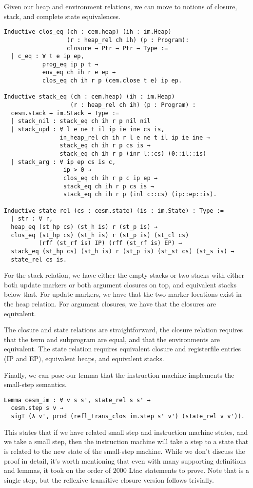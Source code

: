 Given our heap and environment relations, we can move to notions of closure,
stack, and complete state equivalences.

\begin{verbatim}
Inductive clos_eq (ch : cem.heap) (ih : im.Heap) 
                  (r : heap_rel ch ih) (p : Program):
                  closure → Ptr → Ptr → Type :=
  | c_eq : ∀ t e ip ep, 
           prog_eq ip p t → 
           env_eq ch ih r e ep →
           clos_eq ch ih r p (cem.close t e) ip ep. 

Inductive stack_eq (ch : cem.heap) (ih : im.Heap) 
                   (r : heap_rel ch ih) (p : Program) : 
  cesm.stack → im.Stack → Type := 
  | stack_nil : stack_eq ch ih r p nil nil
  | stack_upd : ∀ l e ne t il ip ie ine cs is, 
                in_heap_rel ch ih r l e ne t il ip ie ine →
                stack_eq ch ih r p cs is →
                stack_eq ch ih r p (inr l::cs) (0::il::is)
  | stack_arg : ∀ ip ep cs is c, 
                 ip > 0 →
                 clos_eq ch ih r p c ip ep →
                 stack_eq ch ih r p cs is → 
                 stack_eq ch ih r p (inl c::cs) (ip::ep::is).

Inductive state_rel (cs : cesm.state) (is : im.State) : Type := 
  | str : ∀ r, 
  heap_eq (st_hp cs) (st_h is) r (st_p is) →
  clos_eq (st_hp cs) (st_h is) r (st_p is) (st_cl cs) 
          (rff (st_rf is) IP) (rff (st_rf is) EP) →
  stack_eq (st_hp cs) (st_h is) r (st_p is) (st_st cs) (st_s is) →
  state_rel cs is.
\end{verbatim}
For the stack relation, we have either the empty stacks or two stacks with
either both update markers or both argument closures on top, and equivalent
stacks below that. For update markers, we have that the two marker locations
exist in the heap relation. For argument closures, we have that the closures are
equivalent. 

The closure and state relations are straightforward, the closure relation
requires that the term and subprogram are equal, and that the environments are
equivalent. The state relation requires equivalent closure and registerfile
entries (IP and EP), equivalent heaps, and equivalent stacks.

Finally, we can pose our lemma that the instruction machine implements the
small-step semantics.

\begin{verbatim}
Lemma cesm_im : ∀ v s s', state_rel s s' → 
  cesm.step s v → 
  sigT (λ v', prod (refl_trans_clos im.step s' v') (state_rel v v')).
\end{verbatim}
This states that if we have related small step and instruction machine states,
and we take a small step, then the instruction machine will take a step to a
state that is related to the new state of the small-step machine.  While we
don't discuss the proof in detail, it's worth mentioning that even with many
supporting definitions and lemmas, it took on the order of 2000 Ltac statements
to prove. Note that is a single step, but the reflexive transitive closure
version follows trivially. 

